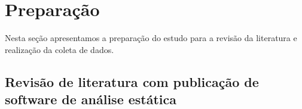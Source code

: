
\section{Preparação} \label{estudo1:preparacao} %

Nesta seção apresentamos a preparação do estudo para a revisão da literatura
e realização da coleta de
dados.

\subsection{Revisão de literatura com publicação de software de análise estática}



